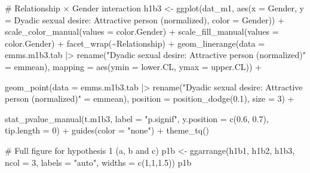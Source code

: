 \documentclass[
  bookmarksnumbered]{article}
\newenvironment{Shaded}{\begin{snugshade}}{\end{snugshade}}
\newcommand{\AttributeTok}[1]{\textcolor[rgb]{0.80,0.80,0.80}{#1}}
\newcommand{\CommentTok}[1]{\textcolor[rgb]{0.50,0.62,0.50}{#1}}
\newcommand{\DecValTok}[1]{\textcolor[rgb]{0.86,0.86,0.80}{#1}}
\newcommand{\FloatTok}[1]{\textcolor[rgb]{0.75,0.75,0.82}{#1}}
\newcommand{\FunctionTok}[1]{\textcolor[rgb]{0.94,0.94,0.56}{#1}}
\newcommand{\NormalTok}[1]{\textcolor[rgb]{0.80,0.80,0.80}{#1}}
\newcommand{\OtherTok}[1]{\textcolor[rgb]{0.94,0.94,0.56}{#1}}
\newcommand{\SpecialCharTok}[1]{\textcolor[rgb]{0.86,0.64,0.64}{#1}}
\newcommand{\StringTok}[1]{\textcolor[rgb]{0.80,0.58,0.58}{#1}}
\begin{document}
\begin{Shaded}
\begin{Highlighting}[]
\CommentTok{\# Relationship × Gender interaction}
\NormalTok{h1b3 }\OtherTok{\textless{}{-}} \FunctionTok{ggplot}\NormalTok{(dat\_m1, }\FunctionTok{aes}\NormalTok{(}\AttributeTok{x =}\NormalTok{ Gender, }\AttributeTok{y =} \StringTok{\textasciigrave{}}\AttributeTok{Dyadic sexual desire: Attractive person (normalized)}\StringTok{\textasciigrave{}}\NormalTok{, }
                           \AttributeTok{color =}\NormalTok{ Gender)) }\SpecialCharTok{+}
  \FunctionTok{scale\_color\_manual}\NormalTok{(}\AttributeTok{values =}\NormalTok{ color.Gender) }\SpecialCharTok{+}
  \FunctionTok{scale\_fill\_manual}\NormalTok{(}\AttributeTok{values =}\NormalTok{ color.Gender) }\SpecialCharTok{+}
  \FunctionTok{facet\_wrap}\NormalTok{(}\SpecialCharTok{\textasciitilde{}}\NormalTok{Relationship) }\SpecialCharTok{+}
  \FunctionTok{geom\_linerange}\NormalTok{(}\AttributeTok{data =}\NormalTok{ emms.m1b3.tab }\SpecialCharTok{|\textgreater{}} 
                  \FunctionTok{rename}\NormalTok{(}\StringTok{"Dyadic sexual desire: Attractive person (normalized)"} \OtherTok{=}\NormalTok{ emmean), }
                \AttributeTok{mapping =} \FunctionTok{aes}\NormalTok{(}\AttributeTok{ymin =}\NormalTok{ lower.CL, }\AttributeTok{ymax =}\NormalTok{ upper.CL)) }\SpecialCharTok{+}
                
  \FunctionTok{geom\_point}\NormalTok{(}\AttributeTok{data =}\NormalTok{ emms.m1b3.tab }\SpecialCharTok{|\textgreater{}} 
                  \FunctionTok{rename}\NormalTok{(}\StringTok{"Dyadic sexual desire: Attractive person (normalized)"} \OtherTok{=}\NormalTok{ emmean), }
             \AttributeTok{position =} \FunctionTok{position\_dodge}\NormalTok{(}\FloatTok{0.1}\NormalTok{), }
             \AttributeTok{size =} \DecValTok{3}\NormalTok{) }\SpecialCharTok{+}
             
  \FunctionTok{stat\_pvalue\_manual}\NormalTok{(t.m1b3, }
                     \AttributeTok{label =} \StringTok{"p.signif"}\NormalTok{, }
                     \AttributeTok{y.position =} \FunctionTok{c}\NormalTok{(}\FloatTok{0.6}\NormalTok{, }\FloatTok{0.7}\NormalTok{), }
                     \AttributeTok{tip.length =} \DecValTok{0}\NormalTok{) }\SpecialCharTok{+}
  \FunctionTok{guides}\NormalTok{(}\AttributeTok{color =} \StringTok{"none"}\NormalTok{) }\SpecialCharTok{+}
  \FunctionTok{theme\_tq}\NormalTok{()}

\CommentTok{\# Full figure for hypothesis 1 (a, b and c)}
\NormalTok{p1b }\OtherTok{\textless{}{-}} \FunctionTok{ggarrange}\NormalTok{(h1b1, h1b2, h1b3,}
                 \AttributeTok{ncol =} \DecValTok{3}\NormalTok{,}
                 \AttributeTok{labels =} \StringTok{"auto"}\NormalTok{,}
                 \AttributeTok{widths =} \FunctionTok{c}\NormalTok{(}\DecValTok{1}\NormalTok{,}\DecValTok{1}\NormalTok{,}\FloatTok{1.5}\NormalTok{))}
\NormalTok{p1b}
\end{Highlighting}
\end{Shaded}
\end{document}
